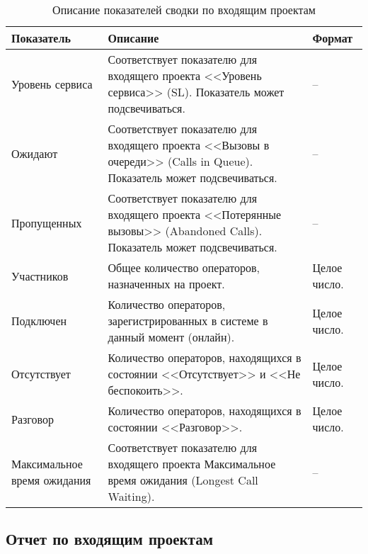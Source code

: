 \begin{table}[ht]
    \caption{Описание показателей сводки по входящим проектам}
    \begin{small}
        \begin{tabular}{|p{}|p{}|p{}|}
            \hline
            Показатель & Описание & Формат \\
            \hline
            Уровень сервиса & Соответствует показателю для входящего проекта <<Уровень сервиса>> (SL).
            Показатель может подсвечиваться. & -- \\
            \hline
            Ожидают &
            Соответствует показателю для входящего проекта <<Вызовы в очереди>> (Calls in Queue).
            Показатель может подсвечиваться. & --\\
            \hline
            Пропущенных &
            Соответствует показателю для входящего проекта <<Потерянные вызовы>> (Abandoned Calls).
            Показатель может подсвечиваться. & -- \\
            \hline
            Участников &
            Общее количество операторов, назначенных на проект. &
            Целое число. \\
            \hline
            Подключен &
            Количество операторов, зарегистрированных в системе в данный момент (онлайн). &
            Целое число. \\
            \hline
            Отсутствует &
            Количество операторов, находящихся в состоянии <<Отсутствует>> и <<Не беспокоить>>. &
            Целое число. \\
            \hline
            Разговор &
            Количество операторов, находящихся в состоянии <<Разговор>>. &
            Целое число. \\
            \hline
            Максимальное время ожидания &
            Соответствует показателю для входящего проекта Максимальное время ожидания (Longest Call Waiting). &
            -- \\
            \hline
        \end{tabular}
    \end{small}
    \label{tab:prj:incoming:ttl:indicators}
\end{table}

\subsection{Отчет по входящим проектам}

